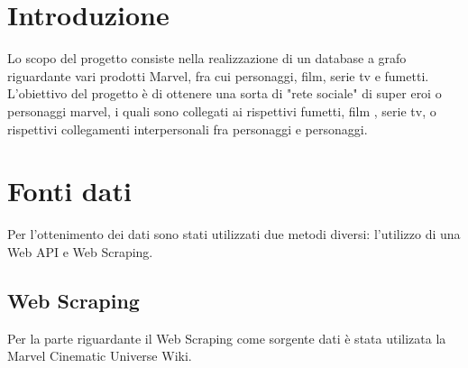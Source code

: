 \documentclass[
12pt, %
a4paper, %
oneside, %
headinclude,footinclude, %
BCOR5mm, %
]{scrartcl}
\begin{document}

\newpage %


\section{Introduzione}
Lo scopo del progetto consiste nella realizzazione di un database a grafo riguardante vari prodotti Marvel, fra cui personaggi, film, serie tv e fumetti.
L'obiettivo del progetto è di ottenere una sorta di "rete sociale" di super eroi o personaggi marvel, i quali sono collegati ai rispettivi fumetti, film , serie tv, o rispettivi collegamenti interpersonali fra personaggi e personaggi.
 

\section{Fonti dati}
Per l'ottenimento dei dati sono stati utilizzati due metodi diversi: l'utilizzo di una Web API e Web Scraping.

\subsection{Web Scraping}
Per la parte riguardante il Web Scraping come sorgente dati è stata utilizata la Marvel Cinematic Universe Wiki.
\end{document}
